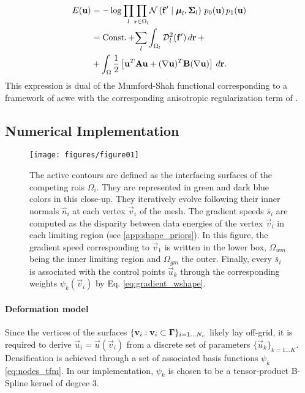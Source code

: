   \begin{align}
  E(\vec{u}) &= -\log \underset{l}{\prod}
  \underset{\vec{r} \in \Omega_l}{\prod}
  \mathcal{N} \left( \vec{f}' \mid \boldsymbol{\mu}_l, \boldsymbol{\Sigma}_l \right)\,p_0( \vec{u})\,p_1( \vec{u}) \notag\\
  &= \const + \underset{l}{\sum} \int_{\Omega_l}
  \mdist{f'}{l} \,d\vec{r} \, + \notag\\
  &+ \int_{\Omega} \frac12 \left[ \vec{u}^T \mathbf{A} \vec{u} + (\nabla \vec{u})^T \mathbf{B} (\nabla \vec{u}) \right] \,d\vec{r}.
  \label{eq:energy}
  \end{align}
%
This expression is dual of the Mumford-Shah functional corresponding
  to a framework of \acrlong*{acwe} \citep{chan_active_2001}
  with the corresponding anisotropic regularization term of \cite{nagel_investigation_1986}.


\subsection{Numerical Implementation}
\label{sec:numerical_implementation}

\begin{figure}
	\texttt{[image: figures/figure01]}
	\caption{The active contours are defined as the interfacing surfaces of the competing
	  \glspl{roi} $\Omega_i$.
	They are represented in green and dark blue colors in this close-up.
	They iteratively evolve following their inner normals $\hat{n}_i$ at each vertex
	  $\vec{v}_i$ of the mesh.
	The gradient speeds $\bar{s}_i$ are computed as the disparity between data energies of
	  the vertex $\vec{v}_i$ in each limiting region (see \ref{app:shape_priors}).
	In this figure, the gradient speed corresponding to $\vec{v}_1$ is written in the lower
	  box, $\Omega_{wm}$ being the inner limiting region and $\Omega_{gm}$ the outer.
	Finally, every $\bar{s}_i$ is associated with the control points $\vec{u}_k$ through
	  the corresponding weights $\psi_k(\vec{v}_i)$ by Eq. \eqref{eq:gradient_wshape}.
	}\label{fig:method}
\end{figure}

\paragraph*{Deformation model}\label{sec:deformation_model}
Since the vertices of the surfaces $\{\mathbf{v}_i: \mathbf{v}_i \subset \boldsymbol{\Gamma} \}_{i=1 \ldots N_v}$
  likely lay off-grid, it is required to derive $\vec{u}_i = \vec{u}(\vec{v}_i)$ from a discrete set of parameters
  $\{\vec{u}_k\}_{k=1 \ldots K}$.
Densification is achieved through a set of associated basis functions $\psi_k$ \eqref{eq:nodes_tfm}.
In our implementation, $\psi_k$ is chosen to be a tensor-product B-Spline kernel
  of degree 3.


